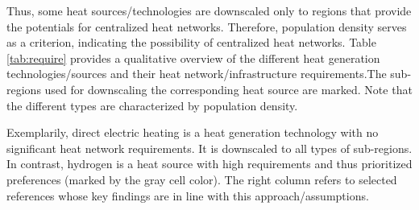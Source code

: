 Thus, some heat sources/technologies are downscaled only to regions that provide the potentials for centralized heat networks. Therefore, population density serves as a criterion, indicating the possibility of centralized heat networks. Table \ref{tab:require} provides a qualitative overview of the different heat generation technologies/sources and their heat network/infrastructure requirements.The sub-regions used for downscaling the corresponding heat source are marked. Note that the different types are characterized by population density.

\vspace{0.3cm}
\begin{table}[h]
	\centering
	\setlength{\extrarowheight}{.5em}
	\caption{Qualitative overview for heat generation technologies/sources and their requirments for heat network infrastructure. The prioritized preferences (gray cell color) of heat sources in sub-regions is marked by the gray color.}
	\label{tab:require}
\end{table}

Exemplarily, direct electric heating is a heat generation technology with no significant heat network requirements. It is downscaled to all types of sub-regions. In contrast, hydrogen is a heat source with high requirements and thus prioritized preferences (marked by the gray cell color). The right column refers to selected references whose key findings are in line with this approach/assumptions.\vspace{0.3cm}


